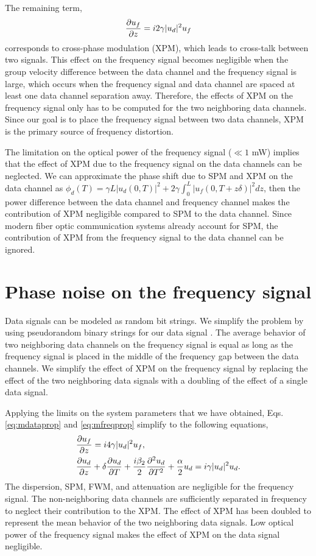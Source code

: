 The remaining term,
\begin{equation}
\frac{\partial u_f}{\partial z} = i2\gamma|u_d|^2u_f
\end{equation}
corresponds to cross-phase modulation (XPM), which leads to cross-talk between two signals. This effect on the frequency signal becomes negligible when the group velocity difference between the data channel and the frequency signal is large, which occurs when the frequency signal and data channel are spaced at least one data channel separation away. Therefore, the effects of XPM on the frequency signal only has to be computed for the two neighboring data channels. Since our goal is to place the frequency signal between two data channels, XPM is the primary source of frequency distortion. 

The limitation on the optical power of the frequency signal ($\ll 1$ mW) implies that the effect of XPM due to the frequency signal on the data channels can be neglected. We can approximate the phase shift due to SPM and XPM on the data channel as $\phi_d(T) = \gamma L|u_d(0,T)|^2 + 2\gamma\int_0^L |u_f(0,T+z\delta)|^2 dz$, then the power difference between the data channel and frequency channel makes the contribution of XPM negligible compared to SPM to the data channel. Since modern fiber optic communication systems already account for SPM, the contribution of XPM from the frequency signal to the data channel can be ignored.

\section{Phase noise on the frequency signal} \label{sec:noisexpm}

Data signals can be modeled as random bit strings. We simplify the problem by using pseudorandom binary strings for our data signal \cite{PRBS}. The average behavior of two neighboring data channels on the frequency signal is equal as long as the frequency signal is placed in the middle of the frequency gap between the data channels. We simplify the effect of XPM on the frequency signal by replacing the effect of the two neighboring data signals with a doubling of the effect of a single data signal.

Applying the limits on the system parameters that we have obtained, Eqs. \ref{eq:mdataprop} and \ref{eq:mfreqprop} simplify to the following equations,
%
\begin{subequations}
\begin{align}
\label{eq:simpledfreq}
&\frac{\partial u_f}{\partial z} = i4\gamma|u_d|^2u_f, \\
\label{eq:simpleddata}
&\frac{\partial u_d}{\partial z} + \delta\frac{\partial u_d}{\partial T} + \frac{i\beta_{2}}{2}\frac{\partial ^2u_d}{\partial T^2} + \frac{\alpha}{2}u_d = i\gamma|u_d|^2u_d.
\end{align}
\end{subequations}
%
The dispersion, SPM, FWM, and attenuation are negligible for the frequency signal. The non-neighboring data channels are sufficiently separated in frequency to neglect their contribution to the XPM. The effect of XPM has been doubled to represent the mean behavior of the two neighboring data signals. Low optical power of the frequency signal makes the effect of XPM on the data signal negligible. 

